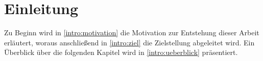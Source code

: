 \chapter{Einleitung}\label{intro}
  Zu Beginn wird in \ref{intro:motivation} die Motivation zur Entstehung dieser Arbeit erläutert, woraus anschließend in \ref{intro:ziel} die Zielstellung abgeleitet wird. Ein Überblick über die folgenden Kapitel wird in \ref{intro:ueberblick} präsentiert.\\
